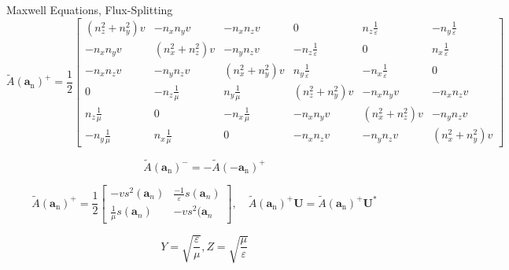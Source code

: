 \begin{frame}{Maxwell Equations, Flux-Splitting}
\tiny
\begin{equation}
\tilde{A}\left(\boldsymbol{a}_{\mathrm{n}}\right)^{+}=\frac{1}{2}\left[\begin{array}{cccccc}{\left(n_{z}^{2}+n_{y}^{2}\right) v} & {-n_{x} n_{y} v} & {-n_{x} n_{z} v} & {0} & {n_{z} \frac{1}{\varepsilon}} & {-n_{y} \frac{1}{\varepsilon}} \\ {-n_{x} n_{y} v} & {\left(n_{x}^{2}+n_{z}^{2}\right) v} & {-n_{y} n_{z} v} & {-n_{z} \frac{1}{\varepsilon}} & {0} & {n_{x} \frac{1}{\varepsilon}} \\ {-n_{x} n_{z} v} & {-n_{y} n_{z} v} & {\left(n_{x}^{2}+n_{y}^{2}\right) v} & {n_{y} \frac{1}{\varepsilon}} & {-n_{x} \frac{1}{\varepsilon}} & {0} \\ {0} & {-n_{z} \frac{1}{\mu}} & {n_{y} \frac{1}{\mu}} & {\left(n_{z}^{2}+n_{y}^{2}\right) v} & {-n_{x} n_{y} v} & {-n_{x} n_{z} v} \\ {n_{z} \frac{1}{\mu}} & {0} & {-n_{x} \frac{1}{\mu}} & {-n_{x} n_{y} v} & {\left(n_{x}^{2}+n_{z}^{2}\right) v} & {-n_{y} n_{z} v} \\ {-n_{y} \frac{1}{\mu}} & {n_{x} \frac{1}{\mu}} & {0} & {-n_{x} n_{z} v} & {-n_{y} n_{z} v} & {\left(n_{x}^{2}+n_{y}^{2}\right) v}\end{array}\right]
\end{equation}
\normalsize

\begin{equation}
\tilde{A}\left(\boldsymbol{a}_{\mathrm{n}}\right)^{-}=-\tilde{A}\left(-\boldsymbol{a}_{\mathrm{n}}\right)^{+}
\end{equation}

\begin{equation}
\tilde{A}\left(\boldsymbol{a}_{\mathrm{n}}\right)^{+}=\frac{1}{2}\begin{bmatrix}
-vs^2(\boldsymbol{a}_n) & \frac{-1}{\varepsilon} s(\boldsymbol{a}_n) \\ 
\frac{1}{\mu} s(\boldsymbol{a}_n) & -vs^2(\boldsymbol{a}_n
\end{bmatrix},\quad \tilde{A}\left(\boldsymbol{a}_{\mathrm{n}}\right)^{+} \boldsymbol{U}=\tilde{A}\left(\boldsymbol{a}_{\mathrm{n}}\right)^{+} \boldsymbol{U}^{*}
\end{equation}




\begin{equation}
Y=\sqrt{\frac{\varepsilon}{\mu}}, Z=\sqrt{\frac{\mu}{\varepsilon}}
\end{equation}
\end{frame}


